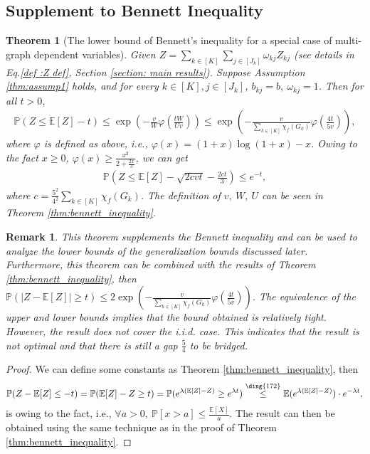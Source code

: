 \documentclass{article}
\def\eE{\mathbb{E}}
\def\pP{\mathbb{P}}
\def\leqone{\overset{\text{\ding{172}}}{\leq}}
\newtheorem{theorem}{Theorem}
\newtheorem*{remark}{Remark}
\begin{document}
\subsection{Supplement to Bennett Inequality}
\label{sec-app:supplement-bennett-lower}
\begin{theorem}[The lower bound of Bennett's inequality for a special case of multi-graph dependent variables] \label{thm: bennett inequality lower bound}
Given $Z = \sum_{k \in [K]} \sum_{j \in [J_k]} \omega_{kj}Z_{kj} $ (see details in Eq.\eqref{def :Z def}, Section \ref{section: main results}).  Suppose Assumption \ref{thm:assump1} holds, and for every $k \in [K], j \in [J_k]$, $b_{kj}=b, ~\omega_{kj}=1$. Then for all $t>0$, 
\begin{align}
    \label{eq:thm_bennet_lower}
    \pP (Z \leq \eE[Z] - t) \leq \exp \left( - \frac{v}{W} \varphi \left( \frac{tW}{Uv} \right) \right) \leq \exp \left( -\frac{v}{\sum_{k \in [K]} \chi_f(G_k) } \varphi \left(\frac{4t}{5v} \right) \right) ,
\end{align}
where $\varphi$ is defined as above, i.e., $\varphi(x)=(1+x) \log(1+x)-x$. Owing to the fact $x \geq 0$, $\varphi(x) \geq \frac{x^2}{2+ \frac{2x}{3}}$, we can get 
\begin{align}
    \label{eq:thm-bennett_lower2}
    \pP (Z \leq \eE [Z] - \sqrt{2cvt} - \frac{2ct}{3}) \leq e^{-t},
\end{align}
where $c = \frac{5^2}{4^2} \sum_{k \in [K]} \chi_f(G_k)$. The definition of $v,~W,~U$ can be seen in Theorem \ref{thm:bennett_inequality}.      
\end{theorem}

\begin{remark}
    This theorem supplements the Bennett inequality and can be used to analyze the lower bounds of the generalization bounds discussed later. Furthermore, this theorem can be combined with the results of Theorem \ref{thm:bennett_inequality}, then $\pP (|Z - \eE [Z]| \geq t) \leq 2 \exp ( -\frac{v}{\sum_{k \in [K]} \chi_f(G_k)} \varphi (\frac{4t}{5v} ) )$. The equivalence of the upper and lower bounds implies that the bound obtained is relatively tight. However, the result does not cover the i.i.d. case. This indicates that the result is not optimal and that there is still a gap $\frac{5}{4}$  to be bridged.
\end{remark}

\begin{proof}
    We can define some constants as Theorem \ref{thm:bennett_inequality}, then
    \begin{align*}
        \pP (Z - \eE[Z] \leq -t) = \pP (\eE[Z] - Z \geq t) = \pP (e^{\lambda (\eE[Z]-Z)} \geq e^{\lambda t}) \leqone \eE(e^{\lambda (\eE[Z]-Z)}) \cdot e^{-\lambda t},
    \end{align*}
 is owing to the fact, i.e.,  $\forall a >0,~ \pP [x >a] \leq \frac{\eE[X]}{a}$. The result can then be obtained using the same technique as in the proof of Theorem \ref{thm:bennett_inequality}. 
\end{proof}
\end{document}
